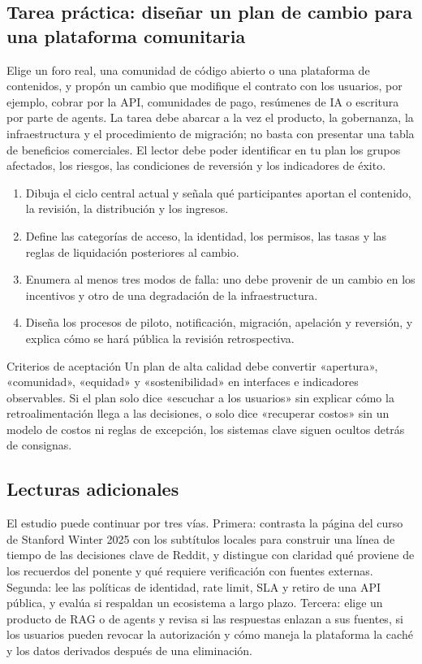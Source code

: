 \subsection{Tarea práctica: diseñar un plan de cambio para una plataforma comunitaria}

Elige un foro real, una comunidad de código abierto o una plataforma de contenidos, y propón un cambio que modifique el contrato con los usuarios, por ejemplo, cobrar por la API, comunidades de pago, resúmenes de IA o escritura por parte de agents. La tarea debe abarcar a la vez el producto, la gobernanza, la infraestructura y el procedimiento de migración; no basta con presentar una tabla de beneficios comerciales. El lector debe poder identificar en tu plan los grupos afectados, los riesgos, las condiciones de reversión y los indicadores de éxito.

\begin{enumerate}
  \item Dibuja el ciclo central actual y señala qué participantes aportan el contenido, la revisión, la distribución y los ingresos.
  \item Define las categorías de acceso, la identidad, los permisos, las tasas y las reglas de liquidación posteriores al cambio.
  \item Enumera al menos tres modos de falla: uno debe provenir de un cambio en los incentivos y otro de una degradación de la infraestructura.
  \item Diseña los procesos de piloto, notificación, migración, apelación y reversión, y explica cómo se hará pública la revisión retrospectiva.
\end{enumerate}

\begin{knowledgebox}{Criterios de aceptación}
Un plan de alta calidad debe convertir «apertura», «comunidad», «equidad» y «sostenibilidad» en interfaces e indicadores observables. Si el plan solo dice «escuchar a los usuarios» sin explicar cómo la retroalimentación llega a las decisiones, o solo dice «recuperar costos» sin un modelo de costos ni reglas de excepción, los sistemas clave siguen ocultos detrás de consignas.
\end{knowledgebox}

\subsection{Lecturas adicionales}

El estudio puede continuar por tres vías. Primera: contrasta la página del curso de Stanford Winter 2025 con los subtítulos locales para construir una línea de tiempo de las decisiones clave de Reddit, y distingue con claridad qué proviene de los recuerdos del ponente y qué requiere verificación con fuentes externas. Segunda: lee las políticas de identidad, rate limit, SLA y retiro de una API pública, y evalúa si respaldan un ecosistema a largo plazo. Tercera: elige un producto de RAG o de agents y revisa si las respuestas enlazan a sus fuentes, si los usuarios pueden revocar la autorización y cómo maneja la plataforma la caché y los datos derivados después de una eliminación.

